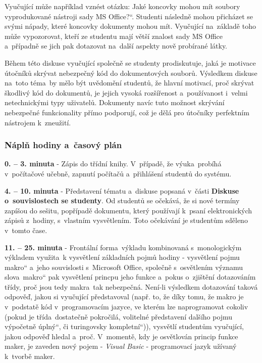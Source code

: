 \documentclass[a4paper, 12pt]{article}
\providecommand{\uv}[1]{\quotedblbase #1\textquotedblleft}
\begin{document}
Vyučující může například vznést otázku: \uv{Jaké koncovky mohou mít soubory vyprodukované nástroji sady MS Office?}. Studenti následně mohou přicházet se svými nápady, které koncovky dokumenty mohou mít. Vyučující na~základě toho může vypozorovat, kteří ze studentu mají větší znalost sady MS Office a~případně se jich pak dotazovat na~další aspekty nově probírané látky. 

Během této diskuse vyučující společně se studenty prodiskutuje, jaká je motivace útočníků skrývat nebezpečný kód do dokumentových souborů. Výsledkem diskuse na~toto téma~by mělo být uvědomění studentů, že hlavní motivací, proč skrývat škodlivý kód do dokumentů, je jejich vysoká rozšířenost a~používanost i~velmi netechnickými typy uživatelů. Dokumenty navíc tuto možnost skrývání nebezpečné funkcionality přímo podporují, což je dělá pro útočníky perfektním nástrojem k~zneužití.

\subsubsection{Náplň hodiny a~časový plán}
\indent\textbf{0. -- 3. minuta} - Zápis do třídní knihy. V~případě, že výuka~probíhá v~počítačové učebně, zapnutí počítačů a~přihlášení studentů do systému.

\textbf{4. -- 10. minuta} - Představení tématu a~diskuse popsaná v~části \textbf{Diskuse o~souvislostech se studenty}. Od studentů se očekává, že si nové termíny zapíšou do sešitu, popřípadě dokumentu, který používají k~psaní elektronických zápisů z~hodiny, s~vlastním vysvětlením. Toto očekávání je studentům sděleno v~tomto čase.

\textbf{11. -- 25. minuta} - Frontální forma~výkladu kombinovaná s~monologickým výkladem využita~k vysvětlení základních pojmů hodiny - vysvětlení pojmu \uv{makro} a~jeho souvislosti s~Microsoft Office, společně s~osvětlením významu slova~\uv{makro} pak vysvětlení princpu jeho funkce a~pokus o~zjištění dotazováním třídy, proč jsou tedy makra~tak nebezpečná. Není-li výsledkem dotazování taková odpověď, jakou si vyučující představoval (např. to, že díky tomu, že makro je v~podstatě kód v~programovacím jazyce, ve kterém lze naprogramovat cokoliv (pokud je třída~dostatečně pokročilá, volitelné představení dalšího pojmu \uv{výpočetně úplný}, či \uv{turingovsky kompletní})), vysvětlí studentům vyučující, jakou odpověď hledal a~proč. V~momentě, kdy je osvětlován princip funkce maker, je zaveden nový pojem - \textit{Visual Basic} - programovací jazyk užívaný k~tvorbě maker.
\end{document}
